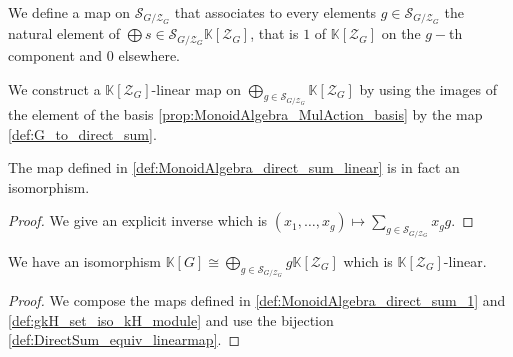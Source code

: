 \begin{definition}
    \label{def:G_to_direct_sum}
    \leanok
    We define a map on $\mathcal{S}_{G/\mathcal{Z}_G}$ that associates to every elements
    $g\in\mathcal{S}_{G/\mathcal{Z}_G}$ the natural element of $\bigoplus\limits{s\in\mathcal{S}_{G/\mathcal{Z}_G}}\mathbb{K}[\mathcal{Z}_G]$,
    that is $1$ of $\mathbb{K}[\mathcal{Z}_G]$ on the $g-$th component and 0 elsewhere.
\end{definition}


\begin{definition}
    \label{def:MonoidAlgebra_direct_sum_linear}
    \leanok
    We construct a $\mathbb{K}[\mathcal{Z}_G]$-linear map on $\bigoplus\limits_{g\in\mathcal{S}_{G/\mathcal{Z}_G}}\mathbb{K}[\mathcal{Z}_G]$
    by using the images of the element of the basis \ref{prop:MonoidAlgebra_MulAction_basis} by the map \ref{def:G_to_direct_sum}.
\end{definition}

\begin{definition}
    \label{def:MonoidAlgebra_direct_sum_1}
    \leanok
    The map defined in \ref{def:MonoidAlgebra_direct_sum_linear} is in fact an isomorphism.
    \begin{proof}
        We give an explicit inverse which is $(x_1,\dots,x_g)\mapsto\sum\limits_{g\in\mathcal{S}_{G/\mathcal{Z}_G}} x_gg$.
    \end{proof}
\end{definition}

\begin{definition}
    \label{def:MonoidAlgebra_direct_sum_system_of_repr_center_set }
    \leanok
    We have an isomorphism $\mathbb{K}[G]\cong \bigoplus\limits_{g\in\mathcal{S}_{G/\mathcal{Z}_G}}g\mathbb{K}[\mathcal{Z}_G]$
    which is $\mathbb{K}[\mathcal{Z}_G]$-linear.
    \begin{proof}
        We compose the maps defined in \ref{def:MonoidAlgebra_direct_sum_1} and \ref{def:gkH_set_iso_kH_module} and use
        the bijection \ref{def:DirectSum_equiv_linearmap}.
    \end{proof}
\end{definition}


